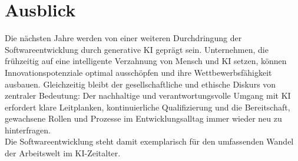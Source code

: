 \section{Ausblick}
Die nächsten Jahre werden von einer weiteren Durchdringung der
Softwareentwicklung durch generative KI geprägt sein. Unternehmen, die
frühzeitig auf eine intelligente Verzahnung von Mensch und KI setzen, können
Innovationspotenziale optimal ausschöpfen und ihre Wettbewerbsfähigkeit
ausbauen. Gleichzeitig bleibt der gesellschaftliche und ethische Diskurs von
zentraler Bedeutung: Der nachhaltige und verantwortungsvolle Umgang mit KI
erfordert klare Leitplanken, kontinuierliche Qualifizierung und die
Bereitschaft, gewachsene Rollen und Prozesse im Entwicklungsalltag immer wieder
neu zu hinterfragen.\\ Die Softwareentwicklung steht damit exemplarisch für den
umfassenden Wandel der Arbeitswelt im KI-Zeitalter.

% 

% 

% 